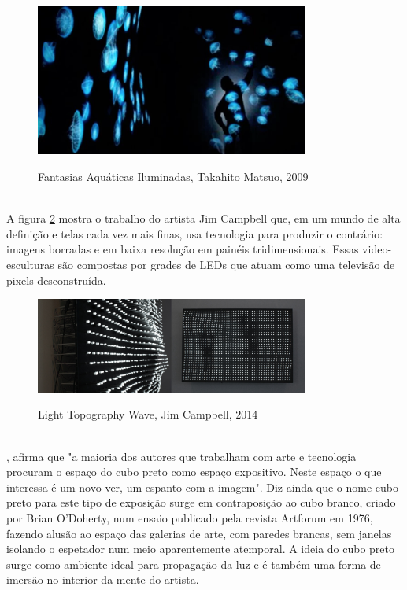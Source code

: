 \begin{figure}[H]
    \centering
    \caption{Fantasias Aquáticas Iluminadas, Takahito Matsuo, 2009}
	\vspace*{0,2cm}
    \includegraphics[width=0.8\textwidth]{./04-figuras/takahito_matsuo}
    \label{fig:takahito_matsuo}
\end{figure}
\vspace*{-0,9cm}
{\raggedright {}}\\

A figura \ref{fig:jim_campbell} mostra o trabalho do artista Jim Campbell que, em um mundo de alta definição e telas cada vez mais finas, usa tecnologia para produzir o contrário: imagens borradas e em baixa resolução em painéis tridimensionais. Essas video-esculturas são compostas por grades de LEDs que atuam como uma televisão de pixels desconstruída. 

\begin{figure}[H]
    \centering
    \caption{Light Topography Wave, Jim Campbell, 2014}
	\vspace*{0,2cm}
    \includegraphics[width=0.8\textwidth]{./04-figuras/jim_campbell}
    \label{fig:jim_campbell}
\end{figure}
\vspace*{-0,9cm}
{\raggedright {}}\\

, afirma que "a maioria dos autores que trabalham com arte e tecnologia procuram o espaço do cubo preto como espaço expositivo. Neste espaço o que interessa é um novo ver, um espanto com a imagem". Diz ainda que o nome cubo preto para este tipo de exposição surge em contraposição ao cubo branco, criado por Brian O'Doherty, num ensaio publicado pela revista Artforum em 1976, fazendo alusão ao espaço das galerias de arte, com paredes brancas, sem janelas isolando o espetador num meio aparentemente atemporal. A ideia do cubo preto surge como ambiente ideal para propagação da luz e é também uma forma de imersão no interior da mente do artista.
